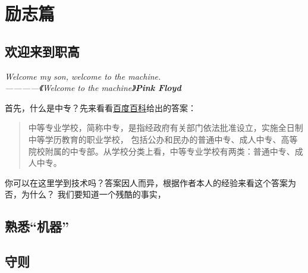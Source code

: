 \section{励志篇}

\subsection{欢迎来到职高}

\begin{center}
\emph{Welcome my son, welcome to the machine.\\————《Welcome to the machine》\textbf{Pink Floyd}}
\end{center}

首先，什么是中专？先来看看\href{https://baike.baidu.com/item/%E4%B8%AD%E7%AD%89%E4%B8%93%E4%B8%9A%E5%AD%A6%E6%A0%A1/1917836}{百度百科}给出的答案：

\begin{abstract}
    中等专业学校，简称中专，是指经政府有关部门依法批准设立，实施全日制中等学历教育的职业学校，
    包括公办和民办的普通中专、成人中专、高等院校附属的中专部。从学校分类上看，中等专业学校有两类：普通中专、成人中专。
\end{abstract}



你可以在这里学到技术吗？答案因人而异，根据作者本人的经验来看这个答案为否，为什么？
我们要知道一个残酷的事实，

\subsection{熟悉“机器”}

\subsection{守则}